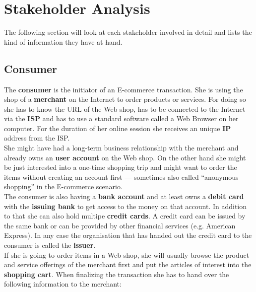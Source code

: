 
\section{Stakeholder Analysis}
\label{sec:stakeholder_analysis}

The following section will look at each stakeholder involved in detail and lists  the kind of information they have at hand.

\subsection{Consumer}
\label{subsec:stakeholder_consumer}

The \textbf{consumer} is the initiator of an E-commerce transaction. She is using the shop of a \textbf{merchant} on the Internet to order products or services. For doing so she has to know the \gls{URL} of the Web shop, has to be connected to the Internet via the \textbf{\gls{ISP}} and has to use a standard software called a Web Browser on her computer. For the duration of her online session she receives an unique \textbf{\gls{IP}} address from the \gls{ISP}.\\

She might have had a long-term business relationship with the merchant and already owns an \textbf{user account} on the Web shop. On the other hand she might be just interested into a one-time shopping trip and might want to order the items without creating an account first --- sometimes also called ``anonymous shopping'' in the E-commerce scenario. \\

The consumer is also having a \textbf{bank account} and at least owns a \textbf{debit card} with the \textbf{issuing bank} to get access to the money on that account. In addition to that she can also hold multipe \textbf{credit cards}. A credit card can be issued by the same bank or can be provided by other financial services (e.g. American Express). In any case the organisation that has handed out the credit card to the consumer is called the \textbf{issuer}. \\

If she is going to order items in a Web shop, she will usually browse the product and service offerings of the merchant first and put the articles of interest into the \textbf{shopping cart}. When finalizing the transaction she has to hand over the following information to the merchant:\@

